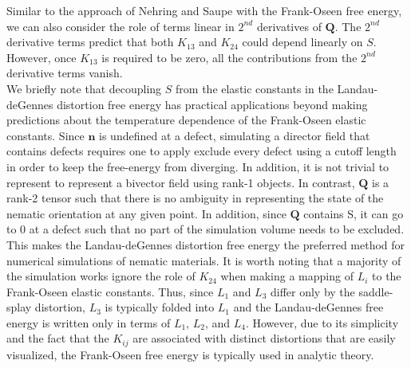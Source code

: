 Similar to the approach of Nehring and Saupe with the Frank-Oseen free energy, we can also consider the role of terms linear in $2^{nd}$ derivatives of $\mathbf{Q}$.
The $2^{nd}$ derivative terms predict that both $K_{13}$ and $K_{24}$ could depend linearly on $S$.
However, once $K_{13}$ is required to be zero, all the contributions from the $2^{nd}$ derivative terms vanish.\\


We briefly note that decoupling $S$ from the elastic constants in the Landau-deGennes distortion free energy has practical applications beyond making predictions about the temperature dependence of the Frank-Oseen elastic constants.
Since $\mathbf{n}$ is undefined at a defect, simulating a director field that contains defects requires one to apply exclude every defect using a cutoff length in order to keep the free-energy from diverging.
In addition, it is not trivial to represent to represent a bivector field using rank-1 objects.
In contrast, $\mathbf{Q}$ is a rank-2 tensor such that there is no ambiguity in representing the state of the nematic orientation at any given point.
In addition, since $\mathbf{Q}$ contains S, it can go to 0 at a defect such that no part of the simulation volume needs to be excluded.
This makes the Landau-deGennes distortion free energy the preferred method for numerical simulations of nematic materials.
It is worth noting that a majority of the simulation works ignore the role of $K_{24}$ when making a mapping of $L_i$ to the Frank-Oseen elastic constants.
Thus, since $L_1$ and $L_3$ differ only by the saddle-splay distortion, $L_3$ is typically folded into $L_1$ and the Landau-deGennes free energy is written only in terms of $L_1$, $L_2$, and $L_4$.
However, due to its simplicity and the fact that the $K_{ij}$ are associated with distinct distortions that are easily visualized, the Frank-Oseen free energy is typically used in analytic theory.\\



